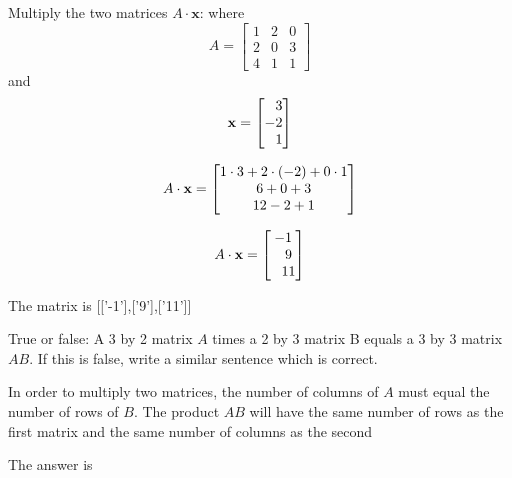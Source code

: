 \documentclass{ximera}
\begin{document}
\begin{question}
Multiply the two matrices $A \cdot \mathbf{x}$:
where 
\[A = \begin{bmatrix} 1&2&0\\2&0&3\\4&1&1 \end{bmatrix}\] and \[\mathbf{x} = \begin{bmatrix}\phantom{-}3\\-2\\\phantom{-}1\end{bmatrix}\]

\begin{solution}
\begin{hint}
\[A \cdot \mathbf{x} = \begin{bmatrix}1\cdot3+2\cdot(-2)+0\cdot1\\6+0+3\\12-2+1\end{bmatrix}\]
\end{hint}

\begin{hint}
\[A \cdot \mathbf{x} = \begin{bmatrix}-1\\\phantom{-}9\\\phantom{-}11\end{bmatrix}\]
\end{hint}

\begin{matrixAnswer}[name=M]
      The matrix is  [['-1'],['9'],['11']]
 \end{matrixAnswer}
\end{solution}
\end{question}

\begin{question}
True or false: A 3 by 2 matrix $A$ times a 2 by 3 matrix B equals a 3 by 3 matrix $AB$. 
If this is false, write a similar sentence which is correct.
\begin{solution}
\begin{hint}
In order to multiply two matrices, the number of columns of $A$ must equal the number of rows of $B$. The product $AB$ will have the same number of rows as the first matrix and the same number of columns as the second
\end{hint}
The answer is 
\end{solution}
\end{question}
\end{document}
